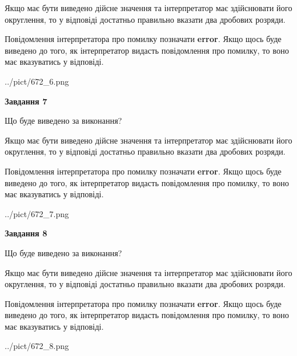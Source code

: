 \documentclass[12pt, ukrainian]{article}
\begin{document}
{\begin {Large}
Якщо має бути виведено дійсне значення та інтерпретатор має здійснювати його округлення, 
то у відповіді достатньо правильно вказати два дробових розряди.

Повідомлення інтерпретатора про помилку позначати \textbf{error}.
Якщо щось буде виведено до того, як інтерпретатор видасть повідомлення про помилку, 
то воно має вказуватись у відповіді. \par

\begin{center}
	{../pict/672_6.png}
\end{center}
\newpage

{\begin {center}\textbf{Завдання 7}\end {center}}\par
Що буде виведено за виконання? \par

Якщо має бути виведено дійсне значення та інтерпретатор має здійснювати його округлення, 
то у відповіді достатньо правильно вказати два дробових розряди.

Повідомлення інтерпретатора про помилку позначати \textbf{error}.
Якщо щось буде виведено до того, як інтерпретатор видасть повідомлення про помилку, 
то воно має вказуватись у відповіді. \par

\begin{center}
	{../pict/672_7.png}
\end{center}
\newpage

{\begin {center}\textbf{Завдання 8}\end {center}}\par
Що буде виведено за виконання? \par

Якщо має бути виведено дійсне значення та інтерпретатор має здійснювати його округлення, 
то у відповіді достатньо правильно вказати два дробових розряди.

Повідомлення інтерпретатора про помилку позначати \textbf{error}.
Якщо щось буде виведено до того, як інтерпретатор видасть повідомлення про помилку, 
то воно має вказуватись у відповіді. \par

\begin{center}
	{../pict/672_8.png}
\end{center}
\newpage


\end{Large}}
\end{document}
